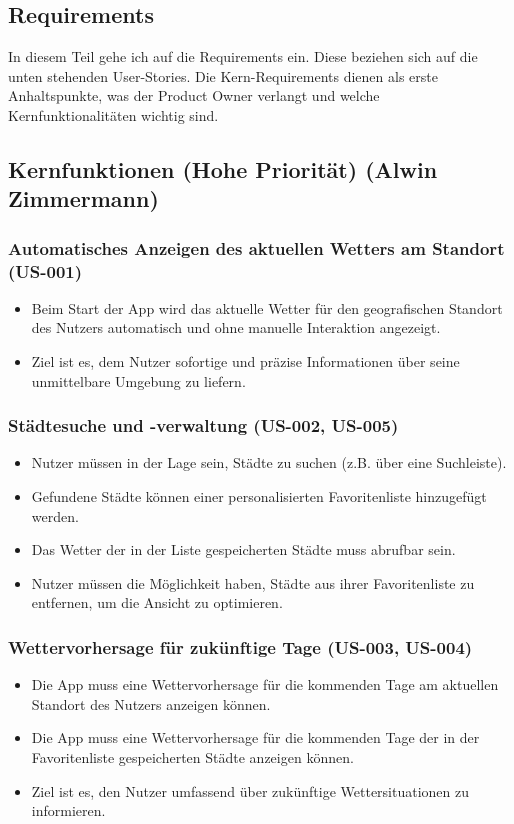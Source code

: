 \documentclass{article}
\begin{document}
\subsection{Requirements}
In diesem Teil gehe ich auf die Requirements ein. Diese beziehen sich auf die unten stehenden User-Stories. Die Kern-Requirements dienen als erste Anhaltspunkte, was der Product Owner verlangt und welche Kernfunktionalitäten wichtig sind.

\subsection{Kernfunktionen (Hohe Priorität) \small{(Alwin Zimmermann)}}

\subsubsection{Automatisches Anzeigen des aktuellen Wetters am Standort (US-001)}
\begin{itemize}
    \item Beim Start der App wird das aktuelle Wetter für den geografischen Standort des Nutzers automatisch und ohne manuelle Interaktion angezeigt.
    \item Ziel ist es, dem Nutzer sofortige und präzise Informationen über seine unmittelbare Umgebung zu liefern.
\end{itemize}

\subsubsection{Städtesuche und -verwaltung (US-002, US-005)}
\begin{itemize}
    \item Nutzer müssen in der Lage sein, Städte zu suchen (z.B. über eine Suchleiste).
    \item Gefundene Städte können einer personalisierten Favoritenliste hinzugefügt werden.
    \item Das Wetter der in der Liste gespeicherten Städte muss abrufbar sein.
    \item Nutzer müssen die Möglichkeit haben, Städte aus ihrer Favoritenliste zu entfernen, um die Ansicht zu optimieren.
\end{itemize}

\subsubsection{Wettervorhersage für zukünftige Tage (US-003, US-004)}
\begin{itemize}
    \item Die App muss eine Wettervorhersage für die kommenden Tage am aktuellen Standort des Nutzers anzeigen können.
    \item Die App muss eine Wettervorhersage für die kommenden Tage der in der Favoritenliste gespeicherten Städte anzeigen können.
    \item Ziel ist es, den Nutzer umfassend über zukünftige Wettersituationen zu informieren.
\end{itemize}
\end{document}
